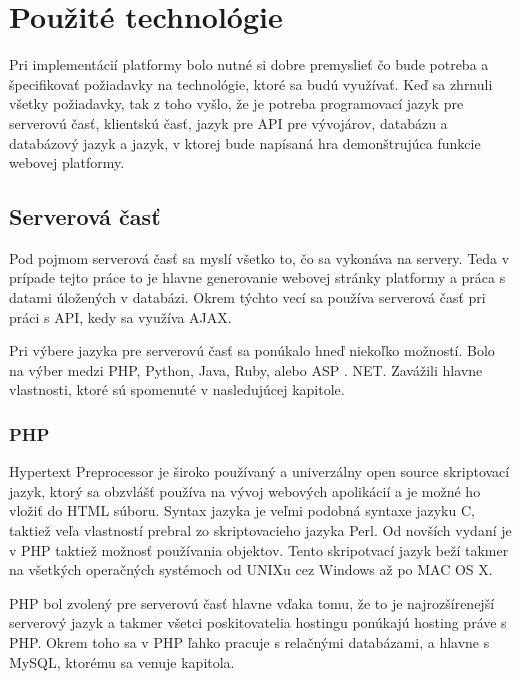 \chapter{Použité technológie}
Pri implementácií platformy bolo nutné si dobre premyslieť čo bude potreba a špecifikovať požiadavky na technológie, ktoré sa budú využívať. Keď sa zhrnuli všetky požiadavky, tak z toho vyšlo, že je potreba programovací jazyk pre serverovú časť, klientskú časť, jazyk pre API pre vývojárov, databázu a databázový jazyk a jazyk, v ktorej bude napísaná hra demonštrujúca funkcie webovej platformy.

\section{Serverová časť}
Pod pojmom serverová časť sa myslí všetko to, čo sa vykonáva na servery. Teda v prípade tejto práce to je hlavne generovanie webovej stránky platformy a práca s datami úložených v databázi. Okrem týchto vecí sa používa serverová časť pri práci s API, kedy sa využíva AJAX.

Pri výbere jazyka pre serverovú časť sa ponúkalo hneď niekoľko možností. Bolo na výber medzi PHP, Python, Java, Ruby, alebo ASP . NET. Zavážili hlavne vlastnosti, ktoré sú spomenuté v nasledujúcej kapitole.
 

\subsection{PHP}
Hypertext Preprocessor je široko používaný a univerzálny open source skriptovací jazyk, ktorý sa obzvlášť používa na vývoj webových apolikácií a je možné ho vložiť do HTML súboru. Syntax jazyka je veľmi podobná syntaxe jazyku C, taktiež veľa vlastností prebral zo skriptovacieho jazyka Perl. Od novších vydaní je v PHP taktiež možnosť používania objektov. Tento skripotvací jazyk beží takmer na všetkých operačných systémoch od UNIXu cez Windows až po MAC OS X.

PHP bol zvolený pre serverovú časť hlavne vďaka tomu, že to je najrozšírenejší serverový jazyk a takmer všetci poskitovatelia hostingu ponúkajú hosting práve s PHP. Okrem toho sa v PHP ľahko pracuje s relačnými databázami, a hlavne s MySQL, ktorému sa venuje kapitola.

